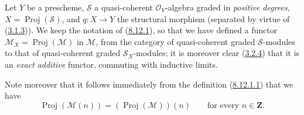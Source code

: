 \begin{env}[8.14.1]
\label{II.8.14.1}
Let $Y$ be a prescheme, $\mathcal{S}$ a quasi-coherent $\mathcal{O}_Y$-algebra
graded in \emph{positive degrees},
$X=\operatorname{Proj}(\mathcal{S})$, and $q:X\to Y$ the structural morphism
(separated by virtue of (\hyperref[II.3.1.3]{3.1.3})). We keep the
notation of (\hyperref[II.8.12.1]{8.12.1}), so that we have
defined a functor
$\mathcal{M}_X=\operatorname{Proj}(\mathcal{M})$ in $\mathcal{M}$, from the
category of quasi-coherent graded $\mathcal{S}$-modules to that of
quasi-coherent graded $\mathcal{S}_X$-modules; it is moreover clear
(\hyperref[II.3.2.4]{3.2.4}) that it is an \emph{exact additive} functor,
commuting with inductive limits.

Note moreover that it follows immediately from the definition
(\hyperref[II.8.12.1.1]{8.12.1.1}) that we have
\begin{equation}
\label{II.8.14.1.1}
  \operatorname{Proj}(\mathcal{M}(n))
  =(\operatorname{Proj}(\mathcal{M}))(n)
  \qquad\text{for every }n\in\mathbf{Z}.
\tag{8.14.1.1}
\end{equation}
\end{env}

